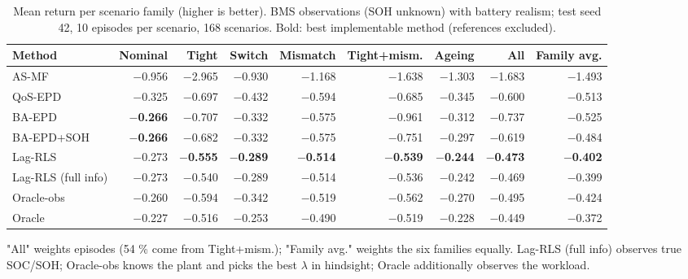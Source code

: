 \begin{table}[t]
\centering
\caption{Mean return per scenario family (higher is better). BMS observations (SOH unknown) with battery realism; test seed 42, 10 episodes per scenario, 168 scenarios. Bold: best implementable method (references excluded).}
\label{tab:main_return}
\footnotesize
\setlength{\tabcolsep}{4pt}
\begin{tabular}{lrrrrrrrr}
\toprule
Method & Nominal & Tight & Switch & Mismatch & Tight+mism. & Ageing & All & Family avg. \\
\midrule
AS-MF & $-$0.956 & $-$2.965 & $-$0.930 & $-$1.168 & $-$1.638 & $-$1.303 & $-$1.683 & $-$1.493 \\
QoS-EPD & $-$0.325 & $-$0.697 & $-$0.432 & $-$0.594 & $-$0.685 & $-$0.345 & $-$0.600 & $-$0.513 \\
BA-EPD & \textbf{$-$0.266} & $-$0.707 & $-$0.332 & $-$0.575 & $-$0.961 & $-$0.312 & $-$0.737 & $-$0.525 \\
BA-EPD+SOH & \textbf{$-$0.266} & $-$0.682 & $-$0.332 & $-$0.575 & $-$0.751 & $-$0.297 & $-$0.619 & $-$0.484 \\
\midrule
Lag-RLS & $-$0.273 & \textbf{$-$0.555} & \textbf{$-$0.289} & \textbf{$-$0.514} & \textbf{$-$0.539} & \textbf{$-$0.244} & \textbf{$-$0.473} & \textbf{$-$0.402} \\
\midrule
Lag-RLS (full info) & $-$0.273 & $-$0.540 & $-$0.289 & $-$0.514 & $-$0.536 & $-$0.242 & $-$0.469 & $-$0.399 \\
Oracle-obs & $-$0.260 & $-$0.594 & $-$0.342 & $-$0.519 & $-$0.562 & $-$0.270 & $-$0.495 & $-$0.424 \\
Oracle & $-$0.227 & $-$0.516 & $-$0.253 & $-$0.490 & $-$0.519 & $-$0.228 & $-$0.449 & $-$0.372 \\
\bottomrule
\end{tabular}
\par\vspace{2pt}\parbox{\linewidth}{\scriptsize "All" weights episodes (54 \% come from Tight+mism.); "Family avg." weights the six families equally. Lag-RLS (full info) observes true SOC/SOH; Oracle-obs knows the plant and picks the best $\lambda$ in hindsight; Oracle additionally observes the workload.}
\end{table}
